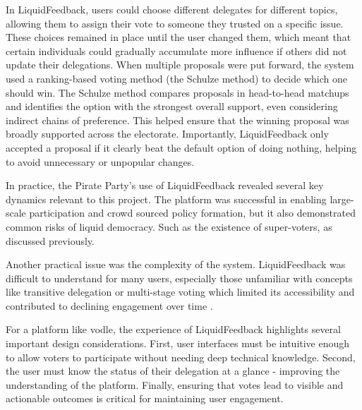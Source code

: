 In LiquidFeedback, users could choose different delegates for different topics, allowing them to assign their vote to someone they trusted on a specific issue. These choices remained in place until the user changed them, which meant that certain individuals could gradually accumulate more influence if others did not update their delegations. When multiple proposals were put forward, the system used a ranking-based voting method (the Schulze method) to decide which one should win. The Schulze method compares proposals in head-to-head matchups and identifies the option with the strongest overall support, even considering indirect chains of preference. This helped ensure that the winning proposal was broadly supported across the electorate. Importantly, LiquidFeedback only accepted a proposal if it clearly beat the default option of doing nothing, helping to avoid unnecessary or unpopular changes.


In practice, the Pirate Party's use of LiquidFeedback revealed several key dynamics relevant to this project. The platform was successful in enabling large-scale participation and crowd sourced policy formation, but it also demonstrated common risks of liquid democracy. Such as the existence of super-voters, as discussed previously.

Another practical issue was the complexity of the system. LiquidFeedback was difficult to understand for many users, especially those unfamiliar with concepts like transitive delegation or multi-stage voting which limited its accessibility and contributed to declining engagement over time \citep{kling2015votingbehaviourpoweronline}.

For a platform like vodle, the experience of LiquidFeedback highlights several important design considerations. First, user interfaces must be intuitive enough to allow voters to participate without needing deep technical knowledge. Second, the user must know the status of their delegation at a glance - improving the understanding of the platform. Finally, ensuring that votes lead to visible and actionable outcomes is critical for maintaining user engagement.

